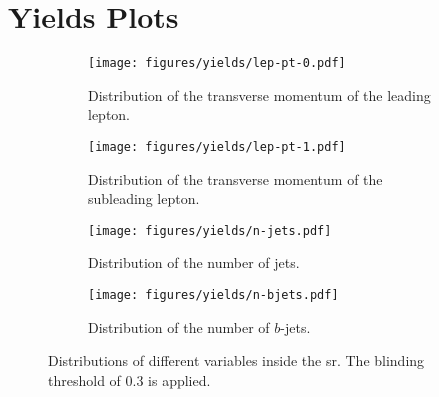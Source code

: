 \clearpage

\section{Yields Plots}
\label{appendix:yields}

\begin{figure}[hbt!]
    \centering
    \begin{subfigure}{0.45\textwidth}
        \texttt{[image: figures/yields/lep-pt-0.pdf]}
        \caption{Distribution of the transverse momentum of the leading lepton.}
    \end{subfigure}\hfill%
    \begin{subfigure}{0.45\textwidth}
        \texttt{[image: figures/yields/lep-pt-1.pdf]}
        \caption{Distribution of the transverse momentum of the subleading lepton.}
    \end{subfigure}

    \vspace{0.5cm}

    \begin{subfigure}{0.45\textwidth}
        \texttt{[image: figures/yields/n-jets.pdf]}
        \caption{Distribution of the number of jets.}
    \end{subfigure}\hfill%
    \begin{subfigure}{0.45\textwidth}
        \texttt{[image: figures/yields/n-bjets.pdf]}
        \caption{Distribution of the number of $b$-jets.}
    \end{subfigure}
    \caption{Distributions of different variables inside the \acrshort{sr}. The blinding threshold of 0.3 is applied.}
\end{figure}


\clearpage